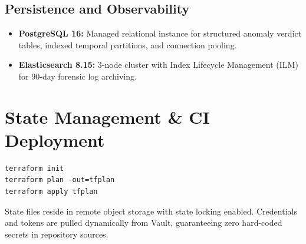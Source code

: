 \documentclass[11pt,a4paper]{article}
\begin{document}
\subsection{Persistence and Observability}
\begin{itemize}[leftmargin=*,itemsep=2pt]
  \item \textbf{PostgreSQL 16:} Managed relational instance for structured anomaly verdict tables, indexed temporal partitions, and connection pooling.
  \item \textbf{Elasticsearch 8.15:} 3-node cluster with Index Lifecycle Management (ILM) for 90-day forensic log archiving.
\end{itemize}

\section{State Management \& CI Deployment}
\begin{lstlisting}
terraform init
terraform plan -out=tfplan
terraform apply tfplan
\end{lstlisting}
State files reside in remote object storage with state locking enabled. Credentials and tokens are pulled dynamically from Vault, guaranteeing zero hard-coded secrets in repository sources.
\end{document}
